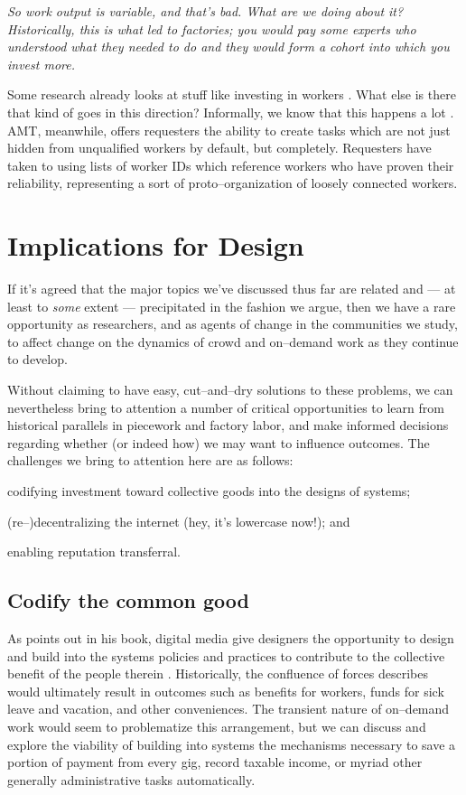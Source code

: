 \documentclass{sigchi}
\begin{document}
\itshape
So work output is variable, and that's bad. What are we doing about it?
Historically, this is what led to factories; you would pay some experts who understood what they needed to do
and they would form a cohort into which you invest more.

Some research already looks at stuff like investing in workers
\cite{shepherdingDow}.
What else is there that kind of goes in this direction?
Informally, we know that this happens a lot
\cite{jonBrelig}.
AMT, meanwhile, offers requesters the ability to create tasks which are
not just hidden from unqualified workers by default, but completely.
Requesters have taken to using lists of worker IDs which reference
workers who have proven their reliability,
representing a sort of proto--organization of loosely connected workers.
\upshape



\section{Implications for Design}
If it's agreed that
the major topics we've discussed thus far are related and
--- at least to \textit{some} extent ---
precipitated in the fashion we argue,
then we have a rare opportunity as researchers,
and as agents of change in the communities we study,
to affect change on the dynamics of crowd and on--demand work
as they continue to develop.

Without claiming to have easy, cut--and--dry solutions to these problems,
we can nevertheless bring to attention a number of critical opportunities to
learn from historical parallels in piecework and factory labor,
and make informed decisions regarding whether
(or indeed how)
we may want to influence outcomes.
The challenges we bring to attention here are as follows:
\begin{inlinelist}
  \item codifying investment toward collective goods into the designs of systems;
  \item (re--)decentralizing the internet (hey, it's lowercase now!); and
  \item enabling reputation transferral.
\end{inlinelist}


\subsection{Codify the common good}
As \citeauthor{lessig2006code} points out in his book,
digital media give designers the opportunity to design and build into the systems
policies and practices to contribute to the collective benefit of the people therein
\cite{lessig2006code}.
Historically, the confluence of forces \citeauthor{lessig2006code} describes
would ultimately result in outcomes such as benefits for workers,
funds for sick leave and vacation, and other conveniences.
The transient nature of on--demand work would seem to problematize this arrangement,
but we can discuss and explore the viability of building into systems the mechanisms necessary
to save a portion of payment from every gig,
record taxable income, or
myriad other generally administrative tasks automatically.
\end{document}
